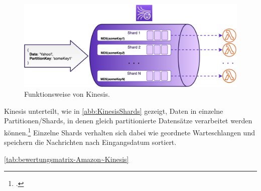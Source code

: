 \begin{figure}[H]
\centering
\includegraphics[width=\textwidth]{graphics/kinesis-inner-workings.png}
\caption[Funktionsweise von Kinesis]{Funktionsweise von Kinesis.\footnotemark}
\label{abb:KinesisShards}
\end{figure}
Kinesis unterteilt, wie in \autoref{abb:KinesisShards} gezeigt, Daten in einzelne Partitionen/Shards, in denen gleich partitionierte Datensätze verarbeitet werden können.\footcite[Vgl. auch im Folgenden][]{Pogosova.28.05.2020} Einzelne Shards verhalten sich dabei wie geordnete Warteschlangen und speichern die Nachrichten nach Eingangsdatum sortiert. 

\autoref{tab:bewertungsmatrix-Amazon~Kinesis}

